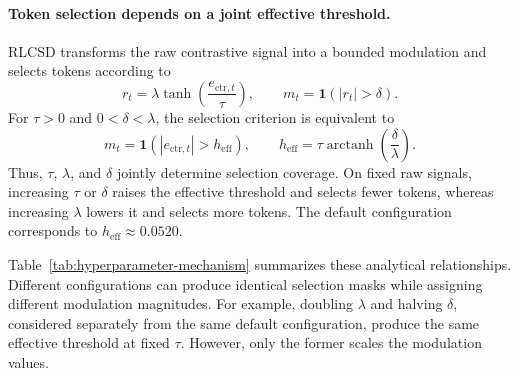 \paragraph{Token selection depends on a joint effective threshold.}
RLCSD transforms the raw contrastive signal into a bounded modulation and selects tokens according to
\begin{equation}
r_t=\lambda\tanh\left(\frac{e_{\mathrm{ctr},t}}{\tau}\right),
\qquad
m_t=\mathbf{1}(|r_t|>\delta).
\end{equation}
For $\tau>0$ and $0<\delta<\lambda$, the selection criterion is equivalent to
\begin{equation}
m_t=\mathbf{1}\left(|e_{\mathrm{ctr},t}|>h_{\mathrm{eff}}\right),
\qquad
h_{\mathrm{eff}}
=\tau\operatorname{arctanh}\left(\frac{\delta}{\lambda}\right).
\end{equation}
Thus, $\tau$, $\lambda$, and $\delta$ jointly determine selection coverage. On fixed raw signals, increasing $\tau$ or $\delta$ raises the effective threshold and selects fewer tokens, whereas increasing $\lambda$ lowers it and selects more tokens. The default configuration corresponds to $h_{\mathrm{eff}}\approx0.0520$.

Table~\ref{tab:hyperparameter-mechanism} summarizes these analytical relationships. Different configurations can produce identical selection masks while assigning different modulation magnitudes. For example, doubling $\lambda$ and halving $\delta$, considered separately from the same default configuration, produce the same effective threshold at fixed $\tau$. However, only the former scales the modulation values.

